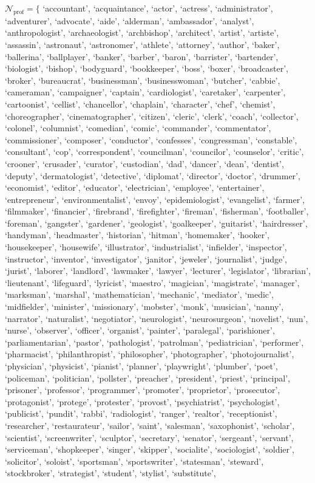 $\mathcal{N}_\text{prof} = \{$ `accountant', `acquaintance', `actor', `actress', `administrator', `adventurer', `advocate', `aide', `alderman', `ambassador', `analyst', `anthropologist', `archaeologist', `archbishop', `architect', `artist', `artiste', `assassin', `astronaut', `astronomer', `athlete', `attorney', `author', `baker', `ballerina', `ballplayer', `banker', `barber', `baron', `barrister', `bartender', `biologist', `bishop', `bodyguard', `bookkeeper', `boss', `boxer', `broadcaster', `broker', `bureaucrat', `businessman', `businesswoman', `butcher', `cabbie', `cameraman', `campaigner', `captain', `cardiologist', `caretaker', `carpenter', `cartoonist', `cellist', `chancellor', `chaplain', `character', `chef', `chemist', `choreographer', `cinematographer', `citizen', `cleric', `clerk', `coach', `collector', `colonel', `columnist', `comedian', `comic', `commander', `commentator', `commissioner', `composer', `conductor', `confesses', `congressman', `constable', `consultant', `cop', `correspondent', `councilman', `councilor', `counselor', `critic', `crooner', `crusader', `curator', `custodian', `dad', `dancer', `dean', `dentist', `deputy', `dermatologist', `detective', `diplomat', `director', `doctor', `drummer', `economist', `editor', `educator', `electrician', `employee', `entertainer', `entrepreneur', `environmentalist', `envoy', `epidemiologist', `evangelist', `farmer', `filmmaker', `financier', `firebrand', `firefighter', `fireman', `fisherman', `footballer', `foreman', `gangster', `gardener', `geologist', `goalkeeper', `guitarist', `hairdresser', `handyman', `headmaster', `historian', `hitman', `homemaker', `hooker', `housekeeper', `housewife', `illustrator', `industrialist', `infielder', `inspector', `instructor', `inventor', `investigator', `janitor', `jeweler', `journalist', `judge', `jurist', `laborer', `landlord', `lawmaker', `lawyer', `lecturer', `legislator', `librarian', `lieutenant', `lifeguard', `lyricist', `maestro', `magician', `magistrate', `manager', `marksman', `marshal', `mathematician', `mechanic', `mediator', `medic', `midfielder', `minister', `missionary', `mobster', `monk', `musician', `nanny', `narrator', `naturalist', `negotiator', `neurologist', `neurosurgeon', `novelist', `nun', `nurse', `observer', `officer', `organist', `painter', `paralegal', `parishioner', `parliamentarian', `pastor', `pathologist', `patrolman', `pediatrician', `performer', `pharmacist', `philanthropist', `philosopher', `photographer', `photojournalist', `physician', `physicist', `pianist', `planner', `playwright', `plumber', `poet', `policeman', `politician', `pollster', `preacher', `president', `priest', `principal', `prisoner', `professor', `programmer', `promoter', `proprietor', `prosecutor', `protagonist', `protege', `protester', `provost', `psychiatrist', `psychologist', `publicist', `pundit', `rabbi', `radiologist', `ranger', `realtor', `receptionist', `researcher', `restaurateur', `sailor', `saint', `salesman', `saxophonist', `scholar', `scientist', `screenwriter', `sculptor', `secretary', `senator', `sergeant', `servant', `serviceman', `shopkeeper', `singer', `skipper', `socialite', `sociologist', `soldier', `solicitor', `soloist', `sportsman', `sportswriter', `statesman', `steward', `stockbroker', `strategist', `student', `stylist', `substitute', 